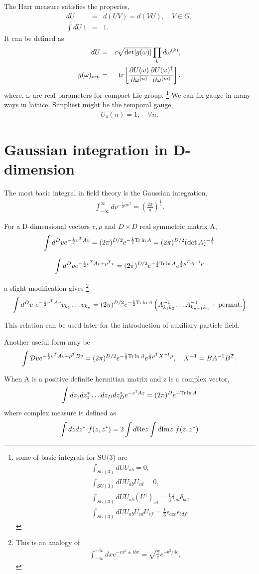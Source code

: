 \documentclass[10pt]{book}
\newcommand{\bea}{\begin{eqnarray}}
\newcommand{\eea}{\end{eqnarray}}
\newcommand{\no}{\nonumber \\}
\newcommand{\del}{\partial}
\begin{document}
The Harr measure satisfies the properies,
\bea
d U&=&d (UV)=d(VU),\quad V \in G,\no 
\int dU\ 1 &=& 1.
\eea 
It can be defined as
\bea
dU&=&c \sqrt{\mbox{det}[g(\omega)]}\prod_{k} d\omega^{(k)},\no 
g(\omega)_{nm}&=&{\rm tr}\left[
   \frac{\del U(\omega)}{\del\omega^{(n)}}
   \frac{\del U(\omega)^\dagger}{\del\omega^{(m)}}     \right].
\eea
where, $\omega$ are real parameters for compact Lie group. 
\footnote{
some of basic integrals for SU(3) are
\bea
& &\int_{SU(3)} dU U_{ab}=0,\no
& &\int_{SU(3)} dU U_{ab} U_{cd}=0,\no
& &\int_{SU(3)} dU U_{ab} (U^\dagger)_{cd}=\frac{1}{3}\delta_{ad}\delta_{bc},\no
& &\int_{SU(3)} dU U_{ab}U_{cd} U_{ef}=\frac{1}{6}\epsilon_{ace}\epsilon_{bdf}.
\eea
}
We can fix gauge in many ways in lattice. Simpliest might be the temporal gauge,
\bea
U_4(n)=1,\quad \forall n .
\eea

\section{Gaussian integration in D-dimension}
The most basic integral in field theory is the Gaussian integration,
\bea
\int_{-\infty}^\infty dv ^{-\frac{1}{2}a v^2}=\left(\frac{2\pi}{a}\right)^{\frac{1}{2}}.
\eea 

For a D-dimensional vectors $v,\rho$ and $D\times D$ real symmetric matrix A, 
\bea 
\int d^D v e^{-\frac{1}{2} v^T A v}=(2\pi)^{D/2} e^{-\frac{1}{2}{\rm Tr} \ln A}
                                  =(2\pi)^{D/2} (\det A)^{-\frac{1}{2}}
\eea
\begin{framed}
\bea
\int d^D v e^{-\frac{1}{2}v^T A v+\rho^T v}
  =(2\pi)^{D/2} e^{-\frac{1}{2}{\rm Tr} \ln A}e^{\frac{1}{2}\rho^T A^{-1} \rho}
\label{eq:gaussian_rhov}  
\eea 
\end{framed} 
a slight modification gives
\footnote{ 	This is an analogy of
	\bea
	\int_{-\infty}^{+\infty} dx e^{-c x^2\pm i b x}=\sqrt{\frac{\pi}{c}}e^{-b^2/4c},
	\eea
}
\bea 
\int d^D v\ e^{-\frac{1}{2} v^T A v} v_{k_1}\dots v_{k_n} 
=(2\pi)^{D/2} e^{-\frac{1}{2}{\rm Tr} \ln A}
\left( A_{k_1 k_2}^{-1}\dots A_{k_{n-1}k_n}^{-1}+\mbox{permut.}\right) 
\eea 

This relation can be used later for the introduction of auxiliary particle field. 

Another useful form may be 
\bea 
\int {\cal D} v e^{-\frac{1}{2} v^T A v +\rho^T B v} =
 (2\pi)^{D/2} e^{-\frac{1}{2}{\rm Tr} \ln A} e^{\frac{1}{2} \rho^T X^{-1} \rho },
\quad X^{-1}=B A^{-1} B^T .
\eea 



When A is a positive definite hermitian matrix and z is a complex vector,
\bea
\int dz_1 d z_1^*\dots dz_D d z_D^* e^{-z^\dagger A z}
  =(2\pi)^D e^{-{\rm Tr}\ln A}
\eea 
where complex measure is defined as
\bea
\int dz dz^*\ f(z,z^*)=2\int d{\rm Re}z \int d {\rm Im}z\ f(z,z^*)
\eea 
\end{document}
